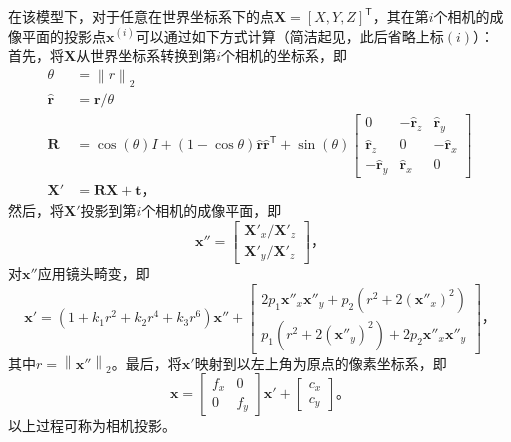 \documentclass{ctexart}
\begin{document}
在该模型下，对于任意在世界坐标系下的点$\mathbf{X}=\left[X,Y,Z\right]^\mathsf{T}$，其在第$i$个相机的成像平面的投影点$\mathbf{x}^{(i)}$可以通过如下方式计算（简洁起见，此后省略上标$(i)$）：
首先，将$\mathbf{X}$从世界坐标系转换到第$i$个相机的坐标系，即
\begin{align}
    \theta &= \left\|r\right\|_2 \\
    \hat{\mathbf{r}} &= \mathbf{r}/ \theta \\
    \mathbf{R} &= \cos(\theta) I + (1- \cos{\theta} ) \hat{\mathbf{r}} \hat{\mathbf{r}}^\mathsf{T} + \sin(\theta) \begin{bmatrix}
         0   & -\hat{\mathbf{r}}_z & \hat{\mathbf{r}}_y \\
         \hat{\mathbf{r}}_z & 0    & -\hat{\mathbf{r}}_x \\
        -\hat{\mathbf{r}}_y &  \hat{\mathbf{r}}_x & 0
    \end{bmatrix} \\
    \mathbf{X}' &= \mathbf{R} \mathbf{X} + \mathbf{t}\text{，}
\end{align}
然后，将$\mathbf{X}'$投影到第$i$个相机的成像平面，即
\begin{equation}
    \mathbf{x}'' = \begin{bmatrix}
        \mathbf{X}'_x / \mathbf{X}'_z \\
        \mathbf{X}'_y / \mathbf{X}'_z
    \end{bmatrix}\text{，}
\end{equation}
对$\mathbf{x}''$应用镜头畸变，即
\begin{equation}
    \mathbf{x}' = \left(1 + k_1 r^2 + k_2 r^4 + k_3 r^6\right) \mathbf{x}'' + \begin{bmatrix}
        2 p_1 \mathbf{x}''_x \mathbf{x}''_y + p_2 \left(r^2 + 2 (\mathbf{x}''_x)^2\right) \\
        p_1 \left(r^2 + 2 (\mathbf{x}''_y)^2\right) + 2 p_2 \mathbf{x}''_x \mathbf{x}''_y
    \end{bmatrix}\text{，}
\end{equation}
其中$r = \left\|\mathbf{x}''\right\|_2$。最后，将$\mathbf{x}'$映射到以左上角为原点的像素坐标系，即
\begin{equation}
    \mathbf{x} = \begin{bmatrix}f_x & 0 \\ 0 & f_y \end{bmatrix} \mathbf{x}' + \begin{bmatrix}c_x \\ c_y \end{bmatrix}\text{。}
\end{equation}
以上过程可称为相机投影。
\end{document}
